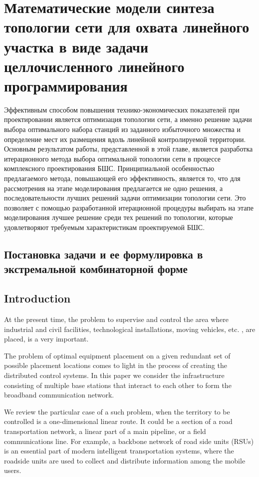 \chapter{Математические модели синтеза топологии сети для охвата линейного участка в виде задачи целлочисленного линейного программирования}

Эффективным способом повышения технико-экономических показателей при проектировании  является оптимизация топологии сети, а именно решение задачи выбора оптимального набора станций из заданного избыточного множества и определение мест их размещения вдоль линейной контролируемой территории.
Основным результатом работы, представленной в этой главе, является разработка итерационного метода выбора оптимальной топологии сети в процессе комплексного проектирования БШС. 
Принципиальной особенностью предлагаемого метода, повышающей его эффективность, является то, что для рассмотрения на этапе моделирования предлагается не одно решения, а последовательности лучших решений задачи оптимизации топологии сети. Это позволяет с помощью разработанной итерационной процедуры выбирать на этапе моделирования лучшее решение среди тех решений по топологии, которые удовлетворяют требуемым характеристикам проектируемой БШС. 

\section{Постановка задачи и ее формулировка в экстремальной комбинаторной форме}

\section{Introduction}
At the present time, the problem to supervise and control the area where industrial and civil facilities, technological installations, moving vehicles, etc. , are placed, is a very important. 

	The problem of optimal equipment placement on a given redundant set of possible placement locations comes to light in the process of creating the distributed control systems. In this paper we consider the infrastructure consisting of multiple base stations that interact to each other to form the broadband communication network.
 	
 	We review the particular case of a such problem, when the territory to be controlled is a one-dimensional linear route. It could be a section of a road transportation network, a linear part of a main pipeline, or a field communications line. For example, a backbone network of road side units (RSUs) is an essential part of modern intelligent transportation systems, where the roadside units are used to collect and distribute information among the mobile users.
 	
